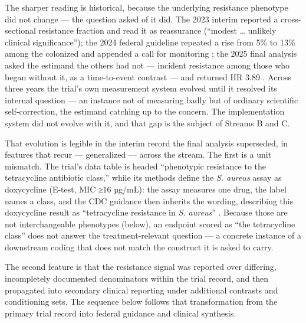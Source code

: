 \documentclass[10pt,letterpaper]{article}
\begin{document}
The sharper reading is historical, because the underlying resistance phenotype did not change
--- the question asked of it did. The 2023 interim reported a
cross-sectional resistance fraction and read it as reassurance (``modest
\ldots{} unlikely clinical significance''); the 2024 federal guideline
repeated a rise from 5\% to 13\% among the colonized and appended a call
for monitoring \cite{cdc2024doxypep}; the 2025 final analysis asked the
estimand the others had not --- incident resistance among those who
began without it, as a time-to-event contrast --- and returned HR 3.89
\cite{luetkemeyer2025}. Across three years the trial's own measurement
system evolved until it resolved its internal question --- an instance
not of measuring badly but of ordinary scientific self-correction, the
estimand catching up to the concern. The implementation system did not
evolve with it, and that gap is the subject of Streams B and C.

That evolution is legible in the interim record the final analysis
superseded, in features that recur --- generalized --- across the
stream. The first is a unit mismatch. The trial's data table is headed
``phenotypic resistance to the tetracycline antibiotic class,''
while its methods define the \emph{S. aureus} assay as
doxycycline (E-test, MIC ≥16 µg/mL): the assay measures one drug,
the label names a class, and the CDC guidance then inherits the wording,
describing this doxycycline result as ``tetracycline resistance in
\emph{S. aureus}'' \cite{cdc2024doxypep}. Because those are not
interchangeable phenotypes (below), an endpoint scored as ``the
tetracycline class'' does not answer the treatment-relevant question ---
a concrete instance of a downstream coding that does not match the
construct it is asked to carry.

The second feature is that the resistance signal was reported over
differing, incompletely documented denominators within the trial record,
and then propagated into secondary clinical reporting under additional
contrasts and conditioning sets. The sequence below follows that
transformation from the primary trial record into federal guidance and
clinical synthesis.
\end{document}
